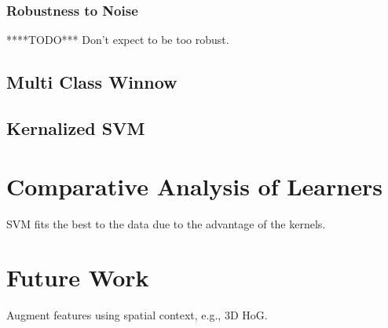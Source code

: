 \documentclass[10pt,a4paper]{article}
\begin{document}
\subsubsection{Robustness to Noise}
****TODO*** Don't expect to be too robust.
\subsection{Multi Class Winnow}

\subsection{Kernalized SVM}


\section{Comparative Analysis of Learners}
SVM fits the best to the data due to the advantage of the kernels.

\section{Future Work}
Augment features using spatial context, e.g., 3D HoG.\\
\end{document}
